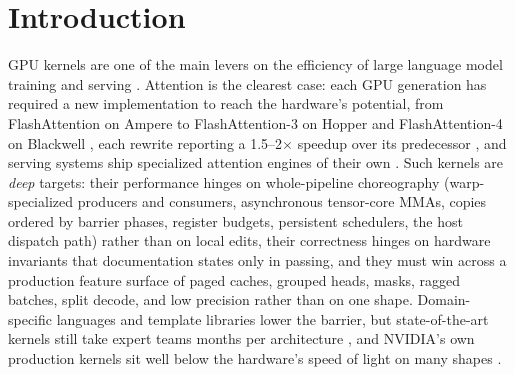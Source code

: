 \section{Introduction}
\label{kernelseek:sec:intro}

GPU kernels are one of the main levers on the efficiency of large language model training and
serving \cite{miao2023towards}. Attention is the clearest case: each GPU generation has
required a new implementation to reach the hardware's potential, from FlashAttention on Ampere
\cite{flashattention,dao2024flashattention2} to FlashAttention-3 on Hopper
\cite{shah2024flashattention3} and FlashAttention-4 on Blackwell \cite{zadouri2026flashattention4},
each rewrite reporting a 1.5--2$\times$ speedup over its predecessor
\cite{dao2024flashattention2,shah2024flashattention3}, and serving systems ship specialized
attention engines of their own \cite{vllm,ye2025flashinfer,miao2024specinfer}. Such kernels
are \emph{deep} targets: their performance hinges on whole-pipeline choreography (warp-specialized
producers and consumers, asynchronous tensor-core MMAs, copies ordered by barrier phases, register
budgets, persistent schedulers, the host dispatch path) rather than on local edits, their
correctness hinges on hardware invariants that documentation states only in passing, and they must
win across a production feature surface of paged caches, grouped heads, masks, ragged batches, split
decode, and low precision rather than on one shape. Domain-specific languages
\cite{triton,spector2025thunderkittens} and template libraries \cite{nvidia2023cutlass}
lower the barrier, but state-of-the-art kernels still take expert teams months per architecture
\cite{shah2024flashattention3,zadouri2026flashattention4}, and NVIDIA's own production kernels sit
well below the hardware's speed of light on many shapes \cite{solexecbench}.

